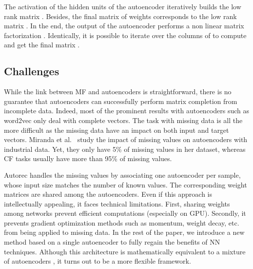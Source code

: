 \documentclass{article}
\begin{document}
The activation of the hidden units of the autoencoder  iteratively builds the low rank matrix . Besides, the final matrix of weights corresponds to the low rank matrix . In the end, the output of the autoencoder performs a non linear matrix factorization . Identically, it is possible to iterate over the columns  of  to compute  and get the final matrix . 





\subsection{Challenges}
While the link between MF and autoencoders is straightforward, there is no guarantee that autoencoders can successfully perform matrix completion from incomplete data. Indeed, most of the prominent results with autoencoders such as word2vec \cite{Mikolov2013} only deal with complete vectors. The task with missing data is all the more difficult as the missing data have an impact on both input and target vectors.
Miranda et al.~\cite{Miranda2012} study the impact of missing values on autoencoders with industrial data. Yet,
they only have 5\% of missing values in her dataset, whereas CF tasks usually have more than 95\% of missing values.


Autorec \cite{Sedhain2015} handles the missing values by associating one autoencoder per sample, whose input size matches the number of known values. The corresponding weight matrices are shared among the autoencoders. Even if this approach is intellectually appealing, it faces technical limitations. First, sharing weights among networks prevent efficient computations (especially on GPU). Secondly, it prevents gradient optimization methods such as momentum, weight decay, etc. from being applied to missing data.
In the rest of the paper, we introduce a new method based on a single autoencoder to fully regain the benefits of NN techniques. Although this architecture is mathematically equivalent to a mixture of autoencoders \cite{Sedhain2015}, it turns out to be a more flexible framework.
\end{document}
